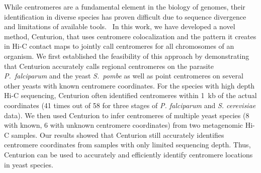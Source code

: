 While centromeres are a fundamental element in the biology of genomes, their
identification in diverse species has proven difficult due to sequence
divergence and limitations of available tools.  In this work, we have
developed a novel method, Centurion, that uses centromere colocalization and
the pattern it creates in Hi-C contact maps to jointly call centromeres for
all chromosomes of an organism.
We first established the feasibility of this approach by demonstrating
that Centurion accurately calls regional centromeres on the parasite
\textit{P.\ falciparum} and the yeast \textit{S.\ pombe} as well as
point centromeres on several other yeasts with known centromere
coordinates.
For the species with high depth Hi-C sequencing, Centurion often identified
centromeres within 1~kb of the actual coordinates (41 times out of 58 for
three stages of \textit{P. falciparum} and \textit{S. cerevisiae} data). We
then used Centurion to infer centromeres of multiple yeast species (8 with
known, 6 with unknown centromere coordinates) from two metagenomic Hi-C
samples. Our results showed that Centurion still accurately identifies
centromere coordinates from samples with only limited sequencing depth. Thus,
Centurion can be used to accurately and efficiently identify centromere
locations in yeast species.

